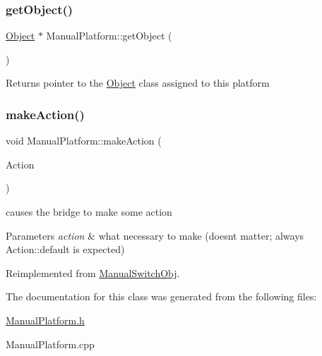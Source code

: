 \subsubsection{\texorpdfstring{get\+Object()}{getObject()}}
{\footnotesize\ttfamily \hyperlink{class_object}{Object} $\ast$ Manual\+Platform\+::get\+Object (\begin{DoxyParamCaption}{ }\end{DoxyParamCaption})}

\begin{DoxyReturn}{Returns}
pointer to the \hyperlink{class_object}{Object} class assigned to this platform 
\end{DoxyReturn}
\mbox{\label{class_manual_platform_ad7ae2aac108330a84246e3337fb5af81}} 
\subsubsection{\texorpdfstring{make\+Action()}{makeAction()}}
{\footnotesize\ttfamily void Manual\+Platform\+::make\+Action (\begin{DoxyParamCaption}\item[{Action}]{ }\end{DoxyParamCaption})\hspace{0.3cm}{\ttfamily [virtual]}}



causes the bridge to make some action 


\begin{DoxyParams}{Parameters}
{\em action} & what necessary to make (doesn\textquotesingle{}t matter; always Action\+::default is expected) \\
\hline
\end{DoxyParams}


Reimplemented from \hyperlink{class_manual_switch_obj}{Manual\+Switch\+Obj}.



The documentation for this class was generated from the following files\+:\begin{DoxyCompactItemize}
\item 
\hyperlink{_manual_platform_8h}{Manual\+Platform.\+h}\item 
Manual\+Platform.\+cpp\end{DoxyCompactItemize}
